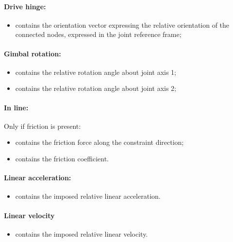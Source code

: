 \paragraph{Drive hinge:}
\begin{itemize}
\item {} contains the orientation vector
  expressing the relative orientation of the connected nodes, expressed in 
  the joint reference frame;
\end{itemize}

\paragraph{Gimbal rotation:}
\begin{itemize}
\item {} contains the relative rotation
  angle about joint axis 1;
\item {} contains the relative rotation
  angle about joint axis 2;
\end{itemize}

\paragraph{In line:}
Only if friction is present:
\begin{itemize}
\item {} contains the friction force along
  the constraint direction;
\item {} contains the friction coefficient.
\end{itemize}

\paragraph{Linear acceleration:}
\begin{itemize}
\item {} contains the imposed relative linear
  acceleration.
\end{itemize}

\paragraph{Linear velocity}
\begin{itemize}
\item {} contains the imposed relative linear
  velocity.
\end{itemize}

